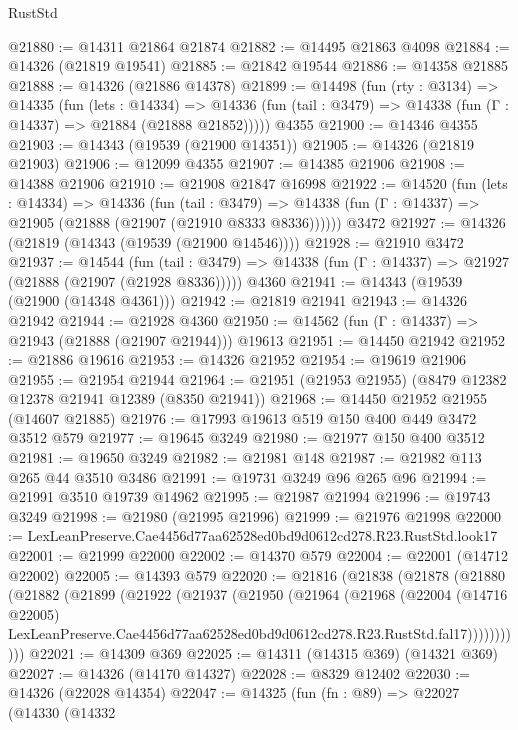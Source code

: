 \begin{lexlean}{RustStd}
\begin{coremodule}
@21880 := @14311 @21864 @21874
@21882 := @14495 @21863 @4098
@21884 := @14326 (@21819 @19541)
@21885 := @21842 @19544
@21886 := @14358 @21885
@21888 := @14326 (@21886 @14378)
@21899 := @14498
    (fun (rty : @3134) =>
    @14335
      (fun (lets : @14334) =>
      @14336 (fun (tail : @3479) => @14338 (fun (Γ : @14337) => @21884 (@21888 @21852)))))
    @4355
@21900 := @14346 @4355
@21903 := @14343 (@19539 (@21900 @14351))
@21905 := @14326 (@21819 @21903)
@21906 := @12099 @4355
@21907 := @14385 @21906
@21908 := @14388 @21906
@21910 := @21908 @21847 @16998
@21922 := @14520
    (fun (lets : @14334) =>
    @14336
      (fun (tail : @3479) =>
      @14338 (fun (Γ : @14337) => @21905 (@21888 (@21907 (@21910 @8333 @8336))))))
    @3472
@21927 := @14326 (@21819 (@14343 (@19539 (@21900 @14546))))
@21928 := @21910 @3472
@21937 := @14544
    (fun (tail : @3479) => @14338 (fun (Γ : @14337) => @21927 (@21888 (@21907 (@21928 @8336)))))
    @4360
@21941 := @14343 (@19539 (@21900 (@14348 @4361)))
@21942 := @21819 @21941
@21943 := @14326 @21942
@21944 := @21928 @4360
@21950 := @14562 (fun (Γ : @14337) => @21943 (@21888 (@21907 @21944))) @19613
@21951 := @14450 @21942
@21952 := @21886 @19616
@21953 := @14326 @21952
@21954 := @19619 @21906
@21955 := @21954 @21944
@21964 := @21951 (@21953 @21955) (@8479 @12382 @12378 @21941 @12389 (@8350 @21941))
@21968 := @14450 @21952 @21955 (@14607 @21885)
@21976 := @17993 @19613 @519 @150 @400 @449 @3472 @3512 @579
@21977 := @19645 @3249
@21980 := @21977 @150 @400 @3512
@21981 := @19650 @3249
@21982 := @21981 @148
@21987 := @21982 @113 @265 @44 @3510 @3486
@21991 := @19731 @3249 @96 @265 @96
@21994 := @21991 @3510 @19739 @14962
@21995 := @21987 @21994
@21996 := @19743 @3249
@21998 := @21980 (@21995 @21996)
@21999 := @21976 @21998
@22000 := LexLeanPreserve.Cae4456d77aa62528ed0bd9d0612cd278.R23.RustStd.look17
@22001 := @21999 @22000
@22002 := @14370 @579
@22004 := @22001 (@14712 @22002)
@22005 := @14393 @579
@22020 := @21816
    (@21838
      (@21878
        (@21880
          (@21882
            (@21899
              (@21922
                (@21937
                  (@21950
                    (@21964
                      (@21968
                        (@22004
                          (@14716 @22005)
                          LexLeanPreserve.Cae4456d77aa62528ed0bd9d0612cd278.R23.RustStd.fal17)))))))))))
@22021 := @14309 @369
@22025 := @14311 (@14315 @369) (@14321 @369)
@22027 := @14326 (@14170 @14327)
@22028 := @8329 @12402
@22030 := @14326 (@22028 @14354)
@22047 := @14325
    (fun (fn : @89) =>
    @22027
      (@14330
        (@14332

\end{coremodule}
\end{lexlean}
